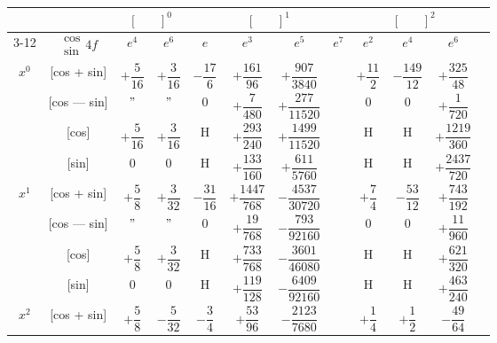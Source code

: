 \documentclass[11pt,a4paper]{book}
\begin{document}
{{\vspace{1em}

\newpage
{}

\begin{center}
\small
\begin{tabular}{|c|c|c|c|c|c|c|c|c|c|c|c|}
\hline
& & \multicolumn{2}{c|}{$[\phantom{()}]^0$} & \multicolumn{4}{c|}{$[\phantom{()}]^1$} & \multicolumn{3}{c|}{$[\phantom{()}]^2$} \\
\cline{3-12}
& $\begin{smallmatrix} \cos \\ \sin \end{smallmatrix} 4f$ & $e^4$ & $e^6$ & $e$ & $e^3$ & $e^5$ & $e^7$ & $e^2$ & $e^4$ & $e^6$ \\
\hline
\multirow{4}{*}{$x^0$} & [cos + sin] & $+\dfrac{5}{16}$ & $+\dfrac{3}{16}$ & $-\dfrac{17}{6}$ & $+\dfrac{161}{96}$ & $+\dfrac{907}{3840}$ & & $+\dfrac{11}{2}$ & $-\dfrac{149}{12}$ & $+\dfrac{325}{48}$ \\
& [cos --- sin] & $"$ & $"$ & $0$ & $+\dfrac{7}{480}$ & $+\dfrac{277}{11520}$ & & $0$ & $0$ & $+\dfrac{1}{720}$ \\
& [cos] & $+\dfrac{5}{16}$ & $+\dfrac{3}{16}$ & H & $+\dfrac{293}{240}$ & $+\dfrac{1499}{11520}$ & & H & H & $+\dfrac{1219}{360}$ \\
& [sin] & $0$ & $0$ & H & $+\dfrac{133}{160}$ & $+\dfrac{611}{5760}$ & & H & H & $+\dfrac{2437}{720}$ \\
\hline
\multirow{4}{*}{$x^1$} & [cos + sin] & $+\dfrac{5}{8}$ & $+\dfrac{3}{32}$ & $-\dfrac{31}{16}$ & $+\dfrac{1447}{768}$ & $-\dfrac{4537}{30720}$ & & $+\dfrac{7}{4}$ & $-\dfrac{53}{12}$ & $+\dfrac{743}{192}$ \\
& [cos --- sin] & $"$ & $"$ & $0$ & $+\dfrac{19}{768}$ & $-\dfrac{793}{92160}$ & & $0$ & $0$ & $+\dfrac{11}{960}$ \\
& [cos] & $+\dfrac{5}{8}$ & $+\dfrac{3}{32}$ & H & $+\dfrac{733}{768}$ & $-\dfrac{3601}{46080}$ & & H & H & $+\dfrac{621}{320}$ \\
& [sin] & $0$ & $0$ & H & $+\dfrac{119}{128}$ & $-\dfrac{6409}{92160}$ & & H & H & $+\dfrac{463}{240}$ \\
\hline
\multirow{4}{*}{$x^2$} & [cos + sin] & $+\dfrac{5}{8}$ & $-\dfrac{5}{32}$ & $-\dfrac{3}{4}$ & $+\dfrac{53}{96}$ & $-\dfrac{2123}{7680}$ & & $+\dfrac{1}{4}$ & $+\dfrac{1}{2}$ & $-\dfrac{49}{64}$ \\

\end{tabular}
\end{center}}}
\end{document}
